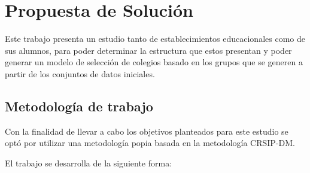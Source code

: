 \chapter{Propuesta de Solución}

Este trabajo presenta un estudio tanto de establecimientos educacionales como de sus alumnos, para poder determinar la estructura que estos presentan y poder generar un modelo de selección de colegios basado en los grupos que se generen a partir de los conjuntos de datos iniciales.

\section{Metodología de trabajo}

Con la finalidad de llevar a cabo los objetivos planteados para este estudio se optó por utilizar una metodología popia basada en la metodología CRSIP-DM. 

El trabajo se desarrolla de la siguiente forma:


